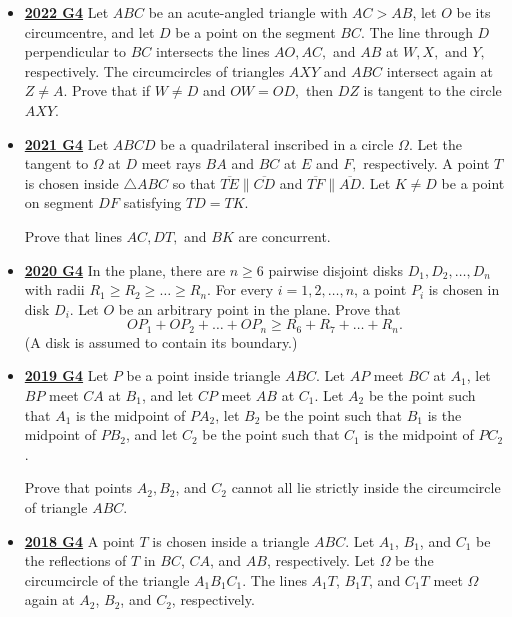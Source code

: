 \documentclass[11pt]{scrartcl}
\begin{document}
\begin{itemize}[leftmargin=*]
Prove that the line tangent to $\omega$ at $P$ meets line $BS$ on the internal angle bisector of $\angle BAC$.
    \item  \href{https://artofproblemsolving.com/community/c6h3107324p28104244}{\textbf{2022 G4}} Let $ABC$ be an acute-angled triangle with $AC > AB$, let $O$ be its circumcentre, and let $D$ be a point on the segment $BC$. The line through $D$ perpendicular to $BC$ intersects the lines $AO, AC,$ and $AB$ at $W, X,$ and $Y,$ respectively. The circumcircles of triangles $AXY$ and $ABC$ intersect again at $Z \ne A$. Prove that if $W \ne D$ and $OW = OD,$ then $DZ$ is tangent to the circle $AXY.$
\item \href{https://artofproblemsolving.com/community/c6h2882537p25627497}{\textbf{2021 G4}} Let $ABCD$ be a quadrilateral inscribed in a circle $\Omega.$ Let the tangent to $\Omega$ at $D$ meet rays $BA$ and $BC$ at $E$ and $F,$ respectively. A point $T$ is chosen inside $\triangle ABC$ so that $\overline{TE}\parallel\overline{CD}$ and $\overline{TF}\parallel\overline{AD}.$ Let $K\ne D$ be a point on segment $DF$ satisfying $TD=TK.$ 

Prove that lines $AC,DT,$ and $BK$ are concurrent.
\item \href{https://artofproblemsolving.com/community/c6h2625900p22698346}{\textbf{2020 G4}} In the plane, there are $n \geqslant  6$ pairwise disjoint disks $D_{1}, D_{2}, \dots, D_{n}$ with radii $R_{1} \geqslant  R_{2} \geqslant  \dots \geqslant  R_{n}$. For every $i=1,2, \dots, n$, a point $P_{i}$ is chosen in disk $D_{i}$. Let $O$ be an arbitrary point in the plane. Prove that\[O P_{1}+O P_{2}+\dots+O P_{n} \geqslant  R_{6}+R_{7}+\dots+R_{n}.\](A disk is assumed to contain its boundary.)
\item \href{https://artofproblemsolving.com/community/c6h2278998p17828733}{\textbf{2019 G4}} Let $P$ be a point inside triangle $ABC$. Let $AP$ meet $BC$ at $A_1$, let $BP$ meet $CA$ at $B_1$, and let $CP$ meet $AB$ at $C_1$. Let $A_2$ be the point such that $A_1$ is the midpoint of $PA_2$, let $B_2$ be the point such that $B_1$ is the midpoint of $PB_2$, and let $C_2$ be the point such that $C_1$ is the midpoint of $PC_2$. 

Prove that points $A_2, B_2$, and $C_2$ cannot all lie strictly inside the circumcircle of triangle $ABC$.
\item \href{https://artofproblemsolving.com/community/c6h1876789p12752914}{\textbf{2018 G4}} A point $T$ is chosen inside a triangle $ABC$. Let $A_1$, $B_1$, and $C_1$ be the reflections of $T$ in $BC$, $CA$, and $AB$, respectively. Let $\Omega$ be the circumcircle of the triangle $A_1B_1C_1$. The lines $A_1T$, $B_1T$, and $C_1T$ meet $\Omega$ again at $A_2$, $B_2$, and $C_2$, respectively. 


\end{itemize}
\end{document}
